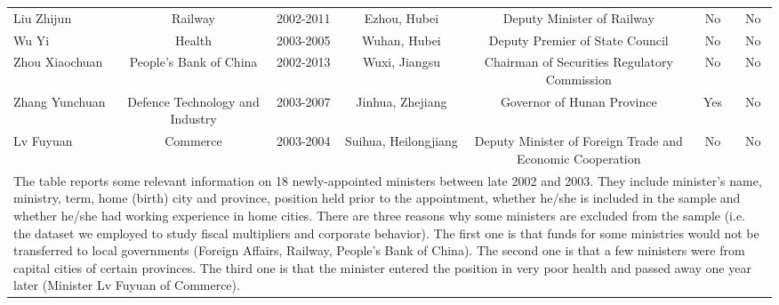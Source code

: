 \documentclass[11pt,a4paper]{article}
\begin{document}
\begin{landscape}
\begin{center}
\begin{scriptsize}
\begin{tabular}{lcccccc}
Liu Zhijun & Railway & 2002-2011 & Ezhou, Hubei & Deputy Minister of Railway & No & No\\
Wu Yi & Health & 2003-2005 & Wuhan, Hubei & Deputy Premier of State Council & No & No\\
Zhou Xiaochuan & People's Bank of China & 2002-2013 & Wuxi, Jiangsu& Chairman of Securities Regulatory Commission & No & No\\
Zhang Yunchuan & Defence Technology and Industry & 2003-2007 & Jinhua, Zhejiang& Governor of Hunan Province & Yes & No \\
Lv Fuyuan & Commerce & 2003-2004 & Suihua, Heilongjiang & Deputy Minister of Foreign Trade and Economic Cooperation & No  & No\\
[0.25em]
\hline \hline
\multicolumn{7}{p{26.2cm}}{\footnotesize The table reports some relevant information on 18 newly-appointed ministers between late 2002 and 2003. They include minister's name, ministry, term, home (birth) city and province, position held prior to the appointment, whether he/she is included in the sample and whether he/she had working experience in home cities. There are three reasons why some ministers are excluded from the sample (i.e. the dataset we employed to study fiscal multipliers and corporate behavior). The first one is that funds for some ministries would not be transferred to local governments (Foreign Affairs, Railway, People's Bank of China). The second one is that a few ministers were from capital cities of certain provinces. The third one is that the minister entered the position in very poor health and passed away one year later (Minister Lv Fuyuan of Commerce). 
}\\
\end{tabular}

\end{scriptsize}
\end{center}



\end{landscape}

\newpage
\end{document}
